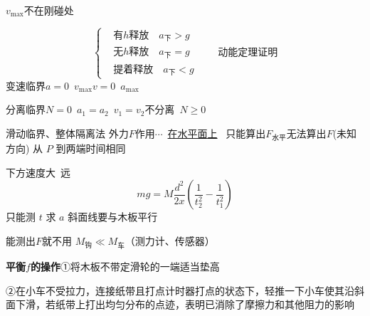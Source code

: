 $v_{\max}$不在刚碰处


\[
\left\{\begin{aligned}
&\text{有}h\text{释放}\quad a_{\text{下}}>g\\
&\text{无}h\text{释放}\quad a_{\text{下}}=g\\
&\text{提着释放}\quad a_{\text{下}}<g
\end{aligned}\right.
\qquad\text{动能定理证明}
\]
变速临界\quad $a=0$\ $v_{\max}$\quad $v=0$\ $a_{\max}$

分离临界\quad $N=0$\ $a_1=a_2$\ $v_1=v_2$\quad 不分离\ $N\ge 0$

滑动临界、整体隔离法
外力$F$作用$\cdots$\ \underline{在水平面上}\ %
只能算出$F_{\text{水平}}$\quad 无法算出$F$(未知方向)
从 $P$ 到两端时间相同

下方速度大\ 远
\[
mg=M\frac{d^2}{2x}\left(\frac{1}{t_2^2}-\frac{1}{t_1^2}\right)
\]
只能测 $t$ 求 $a$
斜面线要与木板平行 %

能测出$F$就不用 $M_{\text{钩}}\ll M_{\text{车}}$（测力计、传感器）


\textbf{平衡$f$的操作}\quad ①将木板不带定滑轮的一端适当垫高

\hspace{5em}②在小车不受拉力，连接纸带且打点计时器打点的状态下，轻推一下小车使其沿斜面下滑，若纸带上打出均匀分布的点迹，表明已消除了摩擦力和其他阻力的影响

